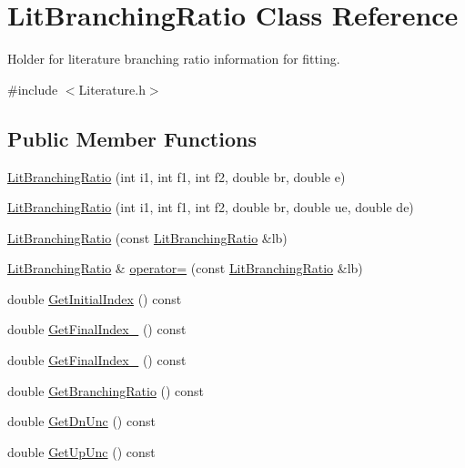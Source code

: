 \hypertarget{classLitBranchingRatio}{\section{Lit\-Branching\-Ratio Class Reference}
\label{classLitBranchingRatio}
}


Holder for literature branching ratio information for fitting.  




{\ttfamily \#include $<$Literature.\-h$>$}

\subsection*{Public Member Functions}
\begin{DoxyCompactItemize}
\item 
\hyperlink{classLitBranchingRatio_ac912cc11c733e036c02e7998a98b1348}{Lit\-Branching\-Ratio} (int i1, int f1, int f2, double br, double e)
\item 
\hyperlink{classLitBranchingRatio_ad7ff19ffc8ed21443761d0f79d6cb7b4}{Lit\-Branching\-Ratio} (int i1, int f1, int f2, double br, double ue, double de)
\item 
\hyperlink{classLitBranchingRatio_a359ce7f1dae8243ba387aed7e8c65b42}{Lit\-Branching\-Ratio} (const \hyperlink{classLitBranchingRatio}{Lit\-Branching\-Ratio} \&lb)
\item 
\hyperlink{classLitBranchingRatio}{Lit\-Branching\-Ratio} \& \hyperlink{classLitBranchingRatio_a7546efad9cdc30b703a21eb2eb8b9531}{operator=} (const \hyperlink{classLitBranchingRatio}{Lit\-Branching\-Ratio} \&lb)
\item 
double \hyperlink{classLitBranchingRatio_ac8425f351405a281999de01ae7b40bee}{Get\-Initial\-Index} () const 
\item 
double \hyperlink{classLitBranchingRatio_a78725adc163c51cddf435326e193ff19}{Get\-Final\-Index\-\_} () const 
\item 
double \hyperlink{classLitBranchingRatio_a4427c6d9384e9a0642b733eb4f92a25f}{Get\-Final\-Index\-\_} () const 
\item 
double \hyperlink{classLitBranchingRatio_a88ac4dc9e863cb58d8fde407f5c46950}{Get\-Branching\-Ratio} () const 
\item 
double \hyperlink{classLitBranchingRatio_a6518a8331e8e6e3bf8ed1b971dfd08b2}{Get\-Dn\-Unc} () const 
\item 
double \hyperlink{classLitBranchingRatio_a408ad2f1bcb2599e837dbaa2f7a56737}{Get\-Up\-Unc} () const 
\end{DoxyCompactItemize}


